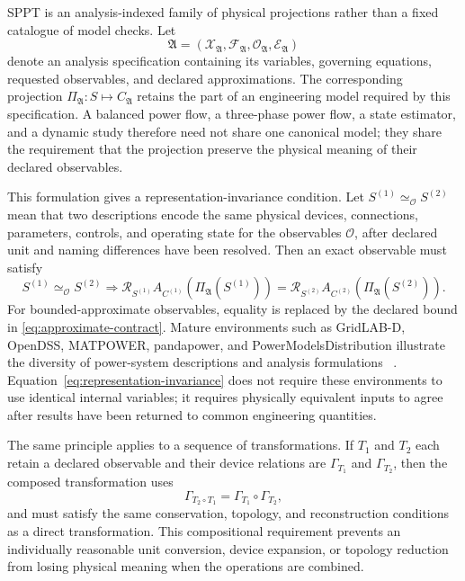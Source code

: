 \documentclass[final,5p,times,twocolumn]{elsarticle}
\newcommand{\Rmap}{\mathcal R}
\newcommand{\Proj}{\Pi}
\begin{document}
SPPT is an analysis-indexed family of physical projections rather than a fixed
catalogue of model checks. Let
\begin{equation}
 \mathfrak A=(\mathcal X_{\mathfrak A},\mathcal F_{\mathfrak A},
 \mathcal O_{\mathfrak A},\mathcal E_{\mathfrak A})
 \label{eq:analysis-signature}
\end{equation}
denote an analysis specification containing its variables, governing
equations, requested observables, and declared approximations. The corresponding
projection $\Proj_{\mathfrak A}:S\mapsto C_{\mathfrak A}$ retains the part of an
engineering model required by this specification. A balanced power flow, a
three-phase power flow, a state estimator, and a dynamic study therefore need
not share one canonical model; they share the requirement that the projection
preserve the physical meaning of their declared observables.

This formulation gives a representation-invariance condition. Let
$S^{(1)}\simeq_{\mathcal O}S^{(2)}$ mean that two descriptions encode the same
physical devices, connections, parameters, controls, and operating state for
the observables $\mathcal O$, after declared unit and naming differences have
been resolved. Then an exact observable must satisfy
\begin{equation}
 S^{(1)}\simeq_{\mathcal O}S^{(2)}\Longrightarrow
 \Rmap_{S^{(1)}}A_{C^{(1)}}\!\left(\Proj_{\mathfrak A}(S^{(1)})\right)
 =
 \Rmap_{S^{(2)}}A_{C^{(2)}}\!\left(\Proj_{\mathfrak A}(S^{(2)})\right).
 \label{eq:representation-invariance}
\end{equation}
For bounded-approximate observables, equality is replaced by the declared bound
in \eqref{eq:approximate-contract}. Mature environments such as GridLAB-D,
OpenDSS, MATPOWER, pandapower, and PowerModelsDistribution illustrate the
diversity of power-system descriptions and analysis formulations
~\cite{gridlabd,opendss,pmd,thurner2018pandapower,zimmerman2011matpower}.
Equation~\eqref{eq:representation-invariance} does not require these
environments to use identical internal variables; it requires physically
equivalent inputs to agree after results have been returned to common
engineering quantities.

The same principle applies to a sequence of transformations. If $T_1$ and
$T_2$ each retain a declared observable and their device relations are
$\Gamma_{T_1}$ and $\Gamma_{T_2}$, then the composed transformation uses
\begin{equation}
 \Gamma_{T_2\circ T_1}=\Gamma_{T_1}\circ\Gamma_{T_2},
 \label{eq:relation-composition}
\end{equation}
and must satisfy the same conservation, topology, and reconstruction conditions
as a direct transformation. This compositional requirement prevents an
individually reasonable unit conversion, device expansion, or topology
reduction from losing physical meaning when the operations are combined.
\end{document}
